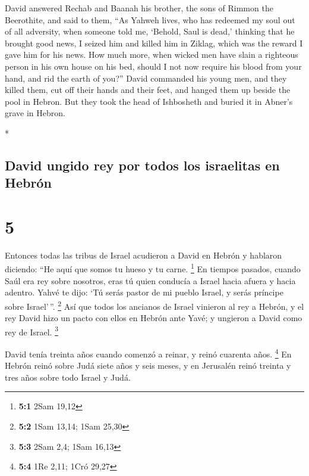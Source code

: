 \begin{paracol}{2}
\begin{otherlanguage}{english}
 David answered Rechab and Baanah his brother, the sons of
Rimmon the Beerothite, and said to them, ``As Yahweh lives, who has
redeemed my soul out of all adversity,  when someone told
me, `Behold, Saul is dead,' thinking that he brought good news, I seized
him and killed him in Ziklag, which was the reward I gave him for his
news.  How much more, when wicked men have slain a
righteous person in his own house on his bed, should I not now require
his blood from your hand, and rid the earth of you?'' 
David commanded his young men, and they killed them, cut off their hands
and their feet, and hanged them up beside the pool in Hebron. But they
took the head of Ishbosheth and buried it in Abner's grave in Hebron.

\end{otherlanguage}

\switchcolumn[0]*

\hypertarget{david-ungido-rey-por-todos-los-israelitas-en-hebruxf3n}{%
\subsection{David ungido rey por todos los israelitas en
Hebrón}\label{david-ungido-rey-por-todos-los-israelitas-en-hebruxf3n}}

\hypertarget{section-8}{%
\section{5}\label{section-8}}

 Entonces todas las tribus de Israel acudieron a David en
Hebrón y hablaron diciendo: ``He aquí que somos tu hueso y tu carne.
\footnote{\textbf{5:1} 2Sam 19,12}  En tiempos pasados,
cuando Saúl era rey sobre nosotros, eras tú quien conducía a Israel
hacia afuera y hacia adentro. Yahvé te dijo: `Tú serás pastor de mi
pueblo Israel, y serás príncipe sobre Israel'\,''. \footnote{\textbf{5:2}
  1Sam 13,14; 1Sam 25,30}  Así que todos los ancianos de
Israel vinieron al rey a Hebrón, y el rey David hizo un pacto con ellos
en Hebrón ante Yavé; y ungieron a David como rey de Israel. \footnote{\textbf{5:3}
  2Sam 2,4; 1Sam 16,13}

 David tenía treinta años cuando comenzó a reinar, y reinó
cuarenta años. \footnote{\textbf{5:4} 1Re 2,11; 1Cró 29,27}
 En Hebrón reinó sobre Judá siete años y seis meses, y en
Jerusalén reinó treinta y tres años sobre todo Israel y Judá.


\end{paracol}
